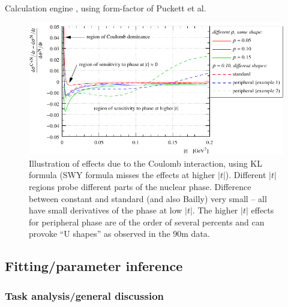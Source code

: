 Calculation engine \cite{elegent}, using form-factor of Puckett et al.~\cite{puckett10}


\begin{figure}
\begin{center}
\includegraphics{fig/cni_effect_illustration.pdf}
\caption{ Illustration of effects due to the Coulomb interaction, using KL formula (SWY formula misses the effects at higher $|t|$). Different $|t|$ regions probe different parts of the nuclear phase. Difference between constant and standard (and also Bailly) very small -- all have small derivatives of the phase at low $|t|$. The higher $|t|$ effects for peripheral phase are of the order of several percents and can provoke ``U shapes'' as observed in the 90m data.
}
\label{fig:cni effect}
\end{center}
\end{figure}

\subsection{Fitting/parameter inference}
\label{sec:cni fitting}

\subsubsection{Task analysis/general discussion}

